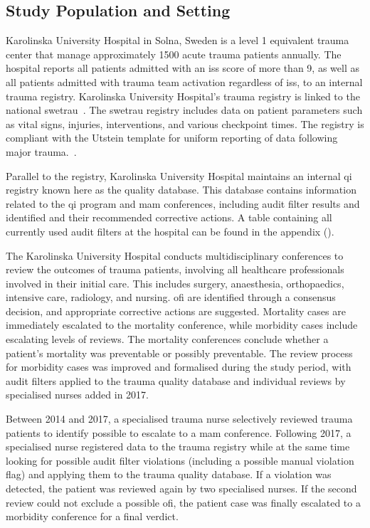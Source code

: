 \documentclass[12pt, a4paper]{article}
\begin{document}
\subsection{Study Population and Setting}
Karolinska University Hospital in Solna, Sweden is a level 1 equivalent trauma center that manage approximately 1500
acute trauma patients annually. The hospital reports all patients admitted with an \acrfull{iss} score of more than 9,
as well as all patients admitted with trauma team activation regardless of \acrshort{iss}, to an internal trauma
registry. Karolinska University Hospital's trauma registry is linked to the national \acrfull{swetrau}~\cite{swetrau}.
The \acrshort{swetrau} registry includes data on patient parameters such as vital signs, injuries, interventions, and
various checkpoint times. The registry is compliant with the Utstein template for uniform reporting of data following
major trauma.~\cite{ringdal_utstein_2008}.

Parallel to the registry, Karolinska University Hospital maintains an internal \acrshort{qi} registry known here as the
quality database. This database contains information related to the \acrshort{qi} program and \acrshort{mam}
conferences, including audit filter results and identified  and their recommended corrective actions. A
table containing all currently used audit filters at the hospital can be found in the appendix
().

The Karolinska University Hospital conducts multidisciplinary conferences to review the outcomes of trauma patients,
involving all healthcare professionals involved in their initial care. This includes surgery, anaesthesia,
orthopaedics, intensive care, radiology, and nursing. \acrshort{ofi} are identified through a consensus decision, and
appropriate corrective actions are suggested. Mortality cases are immediately escalated to the mortality conference,
while morbidity cases include escalating levels of reviews. The mortality conferences conclude whether a patient's
mortality was preventable or possibly preventable. The review process for morbidity cases was improved and formalised
during the study period, with audit filters applied to the trauma quality database and individual reviews by
specialised nurses added in 2017.

Between 2014 and 2017, a specialised trauma nurse selectively reviewed trauma patients to identify possible
 to escalate to a \acrshort{mam} conference. Following 2017, a specialised nurse registered data to the
trauma registry while at the same time looking for possible audit filter violations (including a possible manual
violation flag) and applying them to the trauma quality database. If a violation was detected, the patient was reviewed
again by two specialised nurses. If the second review could not exclude a possible \acrshort{ofi}, the patient case was
finally escalated to a morbidity conference for a final verdict.
\end{document}
